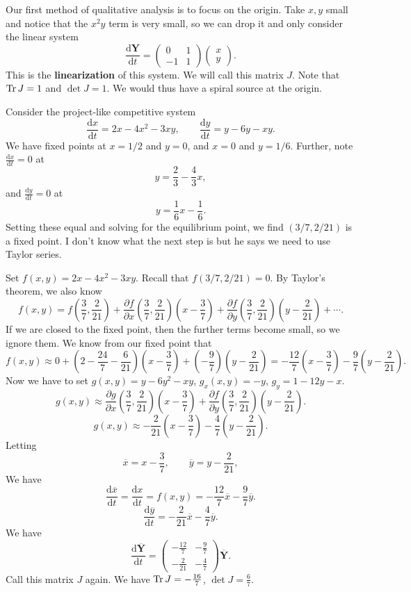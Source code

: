Our first method of qualitative analysis is to focus on the origin. Take $x,y$ small and notice that the $x^2y$ term is very small, so we can drop it and only consider the linear system
\[
	\frac{\mathrm{d}\mathbf{Y}}{\mathrm{d}t} =\begin{pmatrix}
		0&1\\
		-1&1
	\end{pmatrix} \begin{pmatrix}
		x\\ y
	\end{pmatrix} 
.\]
This is the \textbf{linearization} of this system. We will call this matrix $J$. Note that $\operatorname{Tr} J=1$ and $\det J=1$. We would thus have a spiral source at the origin.

Consider the project-like competitive system
\[
	\frac{\mathrm{d}x}{\mathrm{d}t} =2x-4x^2-3xy,\qquad \frac{\mathrm{d}y}{\mathrm{d}t} =y-6y-xy
.\]
We have fixed points at $x=1 /2$ and $y=0$, and $x=0$ and $y=1 /6$. Further, note $\frac{\mathrm{d}x}{\mathrm{d}t} =0$ at
\[
	y=\frac{2}{3}-\frac{4}{3}x
,\]
and $\frac{\mathrm{d}y}{\mathrm{d}t} =0$ at
\[
	y=\frac{1}{6}x-\frac{1}{6}
.\]
Setting these equal and solving for the equilibrium point, we find $(3 /7,2 /21)$ is a fixed point. I don't know what the next step is but he says we need to use Taylor series.

Set $f(x,y)=2x-4x^2-3xy$. Recall that $f(3 /7,2 /21)=0$. By Taylor's theorem, we also know
\[
	f(x,y)=f\left( \frac{3}{7},\frac{2}{21} \right) +\frac{\partial f}{\partial x} \left( \frac{3}{7},\frac{2}{21} \right) \left( x-\frac{3}{7} \right) +\frac{\partial f}{\partial y} \left( \frac{3}{7},\frac{2}{21} \right) \left( y-\frac{2}{21} \right) +\cdots
.\]
If we are closed to the fixed point, then the further terms become small, so we ignore them. We know from our fixed point that
\[
	f(x,y)\approx 0+\left( 2-\frac{24}{7}-\frac{6}{21} \right) \left( x-\frac{3}{7} \right) +\left( -\frac{9}{7} \right) \left( y-\frac{2}{21} \right) =-\frac{12}{7}\left( x-\frac{3}{7} \right) -\frac{9}{7}\left( y-\frac{2}{21} \right) 
.\]
Now we have to set $g(x,y)=y-6y^2-xy$, $g_x(x,y)=-y$, $g_y=1-12y-x$.
\[
	g(x,y)\approx \frac{\partial g}{\partial x} \left( \frac{3}{7},\frac{2}{21} \right) \left( x-\frac{3}{7} \right) +\frac{\partial f}{\partial y} \left( \frac{3}{7},\frac{2}{21} \right) \left( y-\frac{2}{21} \right) 
.\]
\[
	g(x,y)\approx -\frac{2}{21}\left( x-\frac{3}{7} \right) -\frac{4}{7}\left( y-\frac{2}{21} \right) 
.\]
Letting
\[
	\overline{x} =x-\frac{3}{7},\qquad \overline{y} =y-\frac{2}{21}
,\]
We have
\[
	\frac{\mathrm{d}\overline{x} }{\mathrm{d}t} =\frac{\mathrm{d}x}{\mathrm{d}t} =f(x,y)=-\frac{12}{7}\overline{x} -\frac{9}{7}\overline{y} 
.\]
\[
	\frac{\mathrm{d}\overline{y} }{\mathrm{d}t} =-\frac{2}{21}\overline{x} -\frac{4}{7}\overline{y} 
.\]
We have
\[
	\frac{\mathrm{d}\overline{\mathbf{Y}}}{\mathrm{d}t} =\begin{pmatrix}
		-\frac{12}{7}&-\frac{9}{7}\\ -\frac{2}{21}&-\frac{4}{7}
	\end{pmatrix} \overline{\mathbf{Y}} 
.\]
Call this matrix $J$ again. We have $\operatorname{Tr} J=-\frac{16}{7}$, $\det J=\frac{6}{7}$.

